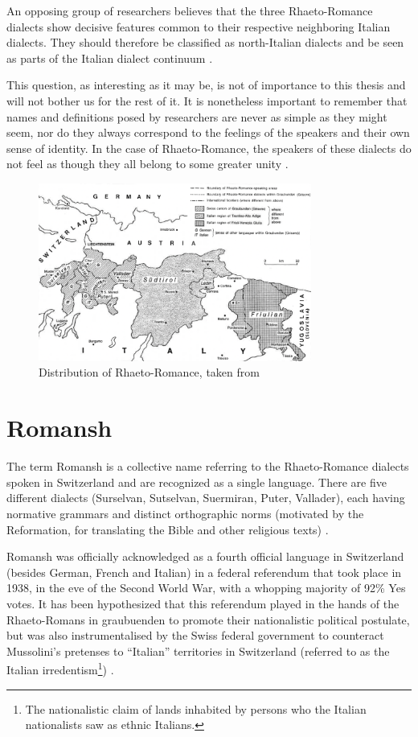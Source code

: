 An opposing group of researchers believes that the three Rhaeto-Romance dialects show decisive  features common to their respective neighboring Italian dialects. 
They should therefore be classified as north-Italian dialects and be seen as parts of the Italian dialect continuum \autocite[174]{bossong2008}.

This question, as interesting as it may be, is not of importance to this thesis and will not bother us for the rest of it.
It is nonetheless important to remember that names and definitions posed by researchers are never as simple as they might seem, nor do they always correspond to the feelings of the speakers and their own sense of identity. 
In the case of Rhaeto-Romance, the speakers of these dialects do not feel as though they all belong to some greater unity \autocite[175]{bossong2008}.

\begin{figure}
\centering
\includegraphics[width=0.8\textwidth]{graphics/raeto-map.png}
\caption[Map of the distribution of Rhaeto-Romance]{Distribution of Rhaeto-Romance, taken from \cite[2]{haiman1992}}
\label{fig:raeto-map}
\end{figure}

\section{Romansh}
The term Romansh is a collective name referring to the Rhaeto-Romance dialects spoken in Switzerland and are recognized as a single language. 
There are five different dialects (Surselvan, Sutselvan, Suermiran, Puter, Vallader), each having normative grammars and distinct orthographic norms (motivated by the Reformation, for translating the Bible and other religious texts) \autocites[1]{haiman1992}[178]{bossong2008}.

Romansh was officially acknowledged as a fourth official language in Switzerland (besides German, French and Italian) in a federal referendum that took place in 1938, in the eve of the Second World War, with a whopping majority of 92\% Yes votes. 
It has been hypothesized that this referendum played in the hands of the Rhaeto-Romans in \Gls{graubuenden} to promote their nationalistic political postulate, but was also instrumentalised by the Swiss federal government to counteract Mussolini's pretenses to \enquote{Italian} territories in Switzerland (referred to as the Italian irredentism\footnote{The nationalistic claim of lands inhabited by persons who the Italian nationalists saw as ethnic Italians.}) \autocite{valaer2012}.

